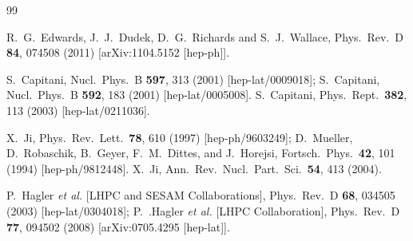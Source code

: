 \documentclass[aps,prd,preprint,tightenlines,superscriptaddress]{revtex4}
\begin{document}
\begin{thebibliography}{99}

  R.~G.~Edwards, J.~J.~Dudek, D.~G.~Richards and S.~J.~Wallace,
  Phys.\ Rev.\ D {\bf 84}, 074508 (2011)
  [arXiv:1104.5152 [hep-ph]].
  
  
  S.~Capitani,
  Nucl.\ Phys.\ B {\bf 597}, 313 (2001)
  [hep-lat/0009018]; %
  S.~Capitani,
  Nucl.\ Phys.\ B {\bf 592}, 183 (2001)
  [hep-lat/0005008].
  S.~Capitani,
  Phys.\ Rept.\  {\bf 382}, 113 (2003)
  [hep-lat/0211036].

  X.~Ji,
  Phys.\ Rev.\ Lett.\  {\bf 78}, 610 (1997)
  [hep-ph/9603249];
  D.~Mueller, D.~Robaschik, B.~Geyer, F.~M.~Dittes, and J.~Horejsi,
  Fortsch.\ Phys.\  {\bf 42}, 101 (1994)
  [hep-ph/9812448].
  X.~Ji,
  Ann.\ Rev.\ Nucl.\ Part.\ Sci.\  {\bf 54}, 413 (2004).

  P.~Hagler {\it et al.}  [LHPC and SESAM Collaborations],
  Phys.\ Rev.\ D {\bf 68}, 034505 (2003)
  [hep-lat/0304018];
  P.~.Hagler {\it et al.}  [LHPC Collaboration],
  Phys.\ Rev.\ D {\bf 77}, 094502 (2008)
  [arXiv:0705.4295 [hep-lat]].


\end{thebibliography}
\end{document}
